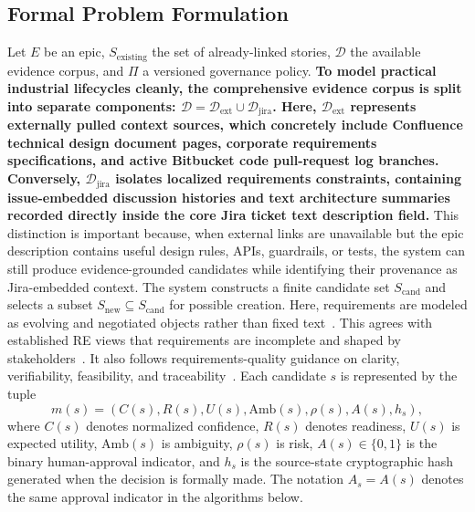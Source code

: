 \documentclass[manuscript,review]{acmart}
\begin{document}
\subsection{Formal Problem Formulation}
Let $E$ be an epic, $S_{\text{existing}}$ the set of already-linked stories, $\mathcal{D}$ the available evidence corpus, and $\Pi$ a versioned governance policy. \textbf{To model practical industrial lifecycles cleanly, the comprehensive evidence corpus is split into separate components: $\mathcal{D} = \mathcal{D}_{\text{ext}} \cup \mathcal{D}_{\text{jira}}$. Here, $\mathcal{D}_{\text{ext}}$ represents externally pulled context sources, which concretely include Confluence technical design document pages, corporate requirements specifications, and active Bitbucket code pull-request log branches. Conversely, $\mathcal{D}_{\text{jira}}$ isolates localized requirements constraints, containing issue-embedded discussion histories and text architecture summaries recorded directly inside the core Jira ticket text description field.} This distinction is important because, when external links are unavailable but the epic description contains useful design rules, APIs, guardrails, or tests, the system can still produce evidence-grounded candidates while identifying their provenance as Jira-embedded context. The system constructs a finite candidate set $S_{\text{cand}}$ and selects a subset $S_{\text{new}} \subseteq S_{\text{cand}}$ for possible creation. Here, requirements are modeled as evolving and negotiated objects rather than fixed text~\cite{R51}. This agrees with established RE views that requirements are incomplete and shaped by stakeholders~\cite{R61}. It also follows requirements-quality guidance on clarity, verifiability, feasibility, and traceability~\cite{R62}. Each candidate $s$ is represented by the tuple
\begin{equation}
m(s) = (C(s), R(s), U(s), \text{Amb}(s), \rho(s), A(s), h_s) ,
\end{equation}
where $C(s)$ denotes normalized confidence, $R(s)$ denotes readiness, $U(s)$ is expected utility, $\text{Amb}(s)$ is ambiguity, $\rho(s)$ is risk, $A(s) \in \{0, 1\}$ is the binary human-approval indicator, and $h_s$ is the source-state cryptographic hash generated when the decision is formally made. The notation $A_s=A(s)$ denotes the same approval indicator in the algorithms below.
\end{document}
